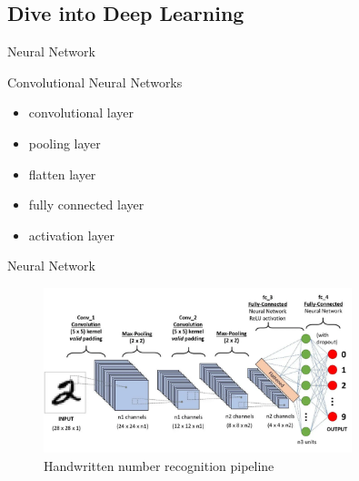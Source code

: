 \subsection{Dive into Deep Learning}
\begin{frame}{Neural Network}
	\begin{block}{Convolutional Neural Networks}
		\begin{itemize}
			\item convolutional layer
			\item pooling layer
			\item flatten layer
			\item fully connected layer
			\item activation layer
		\end{itemize}
	\end{block}
\end{frame}

\begin{frame}{Neural Network}
	\begin{figure}[h]
		\centering
		\includegraphics[width=0.8\textwidth]{images/num_rec.png}
		\caption{Handwritten number recognition pipeline}
		\label{fig:num_rec}
	\end{figure}
\end{frame}

